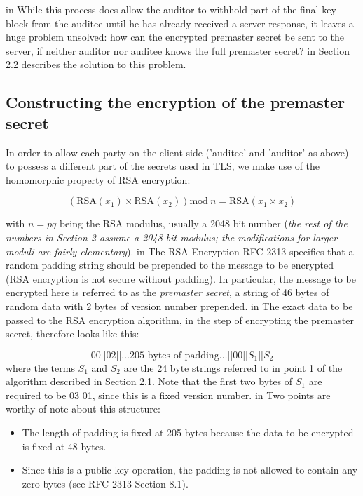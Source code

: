 \documentclass[10pt,a4paper]{article}
\begin{document}
 in 
\noindent While this process does allow the auditor to withhold part of the final key block from the auditee until he has already received a server response, it leaves a huge problem unsolved: how can the encrypted premaster secret be sent to the server, if neither auditor nor auditee knows the full premaster secret?
 in 
\noindent Section 2.2 describes the solution to this problem.


\subsection{Constructing the encryption of the premaster secret}
\noindent In order to allow each party on the client side ('auditee' and 'auditor' as above) to possess a different part of the secrets used in TLS, we make use of the homomorphic property of RSA encryption:
\begin{center}
\[\left(\textrm{RSA}(x_1) \times \textrm{RSA}(x_2)\right) \textrm{mod}\ n = \textrm{RSA}(x_1 \times x_2)\]
\end{center}
\noindent with $n=pq$ being the RSA modulus, usually a 2048 bit number (\textit{the rest of the numbers in Section 2 assume a 2048 bit modulus; the modifications for larger moduli are fairly elementary}).
 in 
\noindent The RSA Encryption RFC 2313 \cite{RSA_spec} specifies that a random padding string should be prepended to the message to be encrypted (RSA encryption is not secure without padding). In particular, the message to be encrypted here is referred to as the \textit{premaster secret}, a string of 46 bytes of random data with 2 bytes of version number prepended.
 in 
\noindent The exact data to be passed to the RSA encryption algorithm, in the step of encrypting the premaster secret, therefore looks like this:

\begin{equation}\label{blockformat}
 00 || 02 || \ldots \textrm{205 bytes of padding} \ldots || 00 || S_1 || S_2  
\end{equation}
where the terms $S_1$ and $S_2$ are the 24 byte strings referred to in point 1 of the algorithm described in Section 2.1. Note that the first two bytes of $S_1$ are required to be 03 01, since this is a fixed version number.
 in 
\noindent Two points are worthy of note about this structure:
\begin{itemize}
\item The length of padding is fixed at 205 bytes because the data to be encrypted is fixed at 48 bytes.
\item Since this is a public key operation, the padding is not allowed to contain any zero bytes (see RFC 2313 Section 8.1).
\end{itemize}
\end{document}
